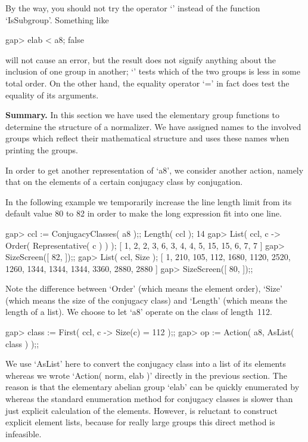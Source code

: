 By the way, you should not try the operator `\<'  instead of the function
`IsSubgroup'. Something like

\beginexample
gap> elab < a8;
false
\endexample

will not cause an error, but the result does not signify anything about the
inclusion of one group in another; `\<' tests  which of the two groups is
less in some total order. On the other hand, the equality operator `=' in
fact does test the equality of its arguments.

{\bf Summary.}   In  this section   we have   used   the elementary group
functions to determine  the structure of  a normalizer. We have  assigned
names  to the involved groups which  reflect their mathematical structure
and {\GAP} uses these names when printing the groups.


In  order to get  another  representation  of  `a8', we consider  another
action, namely  that on  the elements   of a  certain conjugacy  class by
conjugation.

In the following example we temporarily increase the line length limit
from its default value 80 to 82 in order to make the long expression fit
into one line.

\beginexample
gap> ccl := ConjugacyClasses( a8 );; Length( ccl );
14
gap> List( ccl, c -> Order( Representative( c ) ) );
[ 1, 2, 2, 3, 6, 3, 4, 4, 5, 15, 15, 6, 7, 7 ]
gap> SizeScreen([ 82, ]);;
gap> List( ccl, Size );
[ 1, 210, 105, 112, 1680, 1120, 2520, 1260, 1344, 1344, 1344, 3360, 2880, 2880 ]
gap> SizeScreen([ 80, ]);;
\endexample

Note  the  difference between `Order'  (which   means the element order),
`Size' (which means the size of the conjugacy  class) and `Length' (which
means the length of  a list). We choose to  let `a8' operate on the class
of length~112.

\beginexample
gap> class := First( ccl, c -> Size(c) = 112 );;
gap> op := Action( a8, AsList( class ) );;
\endexample

We use `AsList' here  to convert the conjugacy class  into a list  of its
elements whereas we   wrote  `Action( norm,  elab )'   directly in the
previous section. The reason is that  the elementary abelian group `elab'
can  be quickly enumerated by   {\GAP}  whereas the standard  enumeration
method for conjugacy classes is  slower than just explicit calculation of
the elements. However, {\GAP} is reluctant  to construct explicit element
lists, because for really large groups this direct method is infeasible.

